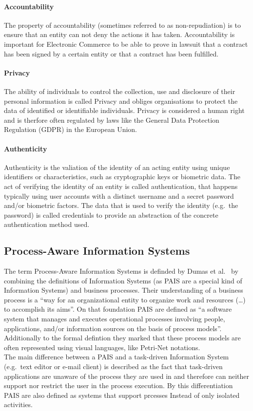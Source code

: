 \documentclass[runningheads]{llncs}
\begin{document}
\paragraph{Accountability} The property of accountability (sometimes referred to as non-repudiation) is to ensure that an entity can not deny the actions it has taken. Accountability is
important for Electronic Commerce to be able to prove in lawsuit that a contract has been signed by a certain entity or that a contract has been fulfilled.
\paragraph{Privacy} The ability of individuals to control the collection, use and disclosure of their personal information is called Privacy and obliges organisations to protect the data of 
identified or identifiable individuals. Privacy is considered a human right~\cite{EU} and is therfore often regulated by laws like the General Data Protection Regulation (GDPR) in the European Union.
\paragraph{Authenticity} Authenticity is the valiation of the identity of an acting entity using unique identifiers or characteristics, such as cryptographic keys or biometric data. 
The act of verifying the identity of an entity is called authentication, that happens typically using user accounts with a distinct username and a secret password and/or biometric factors. 
The data that is used to verify the identity (e.g.\ the password) is called credentials to provide an abstraction of the concrete authentication method used.
\subsection{Process-Aware Information Systems}\label{PAIS}
The term Process-Aware Information Systems is definded by Dumas et al.~\cite{Dumas20051} by combining the definitions of Information Systems (as PAIS are a special kind of Information Systems)
and business processes. Their understanding of a business process is a ``way for an organizational entity to organize work and resources (\ldots) to accomplish its aims''. On that foundation
PAIS are defined as ``a software system that manages and executes operational processes involving people, applications, and/or information sources on the basis of process models''.
Additionally to the formal defintion they marked that these process models are often represented using visual languages, like Petri-Net notations.\\
The main difference between a PAIS and a task-driven Information System (e.g.\ text editor or e-mail client) is described as the fact that task-driven applications are unaware of the process
they are used in and therefore can neither support nor restrict the user in the process execution. By this differentiation PAIS are also defined as systems that support prcesses Instead of only isolated activities.\cite{vanderAalst2016}
\end{document}
